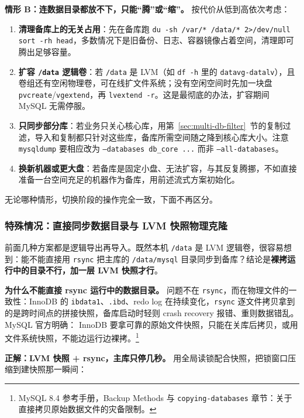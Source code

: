 \documentclass[12pt,UTF8]{ctexbook}
\begin{document}
\textbf{情形 B：连数据目录都放不下，只能“腾”或“缩”。} 按代价从低到高依次考虑：

\begin{enumerate}[leftmargin=2cm]
  \item \textbf{清理备库上的无关占用}：先在备库跑 \texttt{du -sh /var/* /data/* 2>/dev/null \textbar{} sort -rh \textbar{} head}，多数情况下是旧备份、日志、容器镜像占着空间，清理即可腾出足够容量。
  \item \textbf{扩容 \texttt{/data} 逻辑卷}：若 \texttt{/data} 是 LVM（如 \texttt{df -h} 里的 \texttt{datavg-datalv}），且卷组还有空闲物理卷，可在线扩文件系统；没有空闲空间时先加一块盘 \texttt{pvcreate}/\texttt{vgextend}，再 \texttt{lvextend -r}。这是最彻底的办法，扩容期间 MySQL 无需停服。
  \item \textbf{只同步部分库}：若业务只关心核心库，用第~\ref{sec:multi-db-filter}~节的复制过滤，导入和复制都只针对这些库，备库所需空间随之降到核心库大小。注意 \texttt{mysqldump} 要相应改为 \texttt{--databases db\_core ...} 而非 \texttt{--all-databases}。
  \item \textbf{换新机器或更大盘}：若备库是固定小盘、无法扩容，与其反复腾挪，不如直接准备一台空间充足的机器作为备库，用前述流式方案初始化。
\end{enumerate}

无论哪种情形，切换阶段的操作完全一致，下面不再区分。

\subsubsection{特殊情况：直接同步数据目录与 LVM 快照物理克隆}

前面几种方案都是逻辑导出再导入。既然本机 \texttt{/data} 是 LVM 逻辑卷，很容易想到：能不能直接用 \texttt{rsync} 把主库的 \texttt{/data/mysql} 目录同步到备库？结论是\textbf{裸拷运行中的目录不行，加一层 LVM 快照才行}。

\textbf{为什么不能直接 rsync 运行中的数据目录。} 问题不在 \texttt{rsync}，而在物理文件的一致性：InnoDB 的 \texttt{ibdata1}、\texttt{.ibd}、redo log 在持续变化，\texttt{rsync} 逐文件拷贝拿到的是跨时间点的拼接快照，备库启动时轻则 crash recovery 报错、重则数据错乱。MySQL 官方明确： InnoDB 要拿可靠的原始文件快照，只能在关库后拷贝，或用文件系统快照，不能边运行边裸拷。\footnote{MySQL 8.4 参考手册，Backup Methods 与 \texttt{copying-databases} 章节：关于直接拷贝原始数据文件的灾备限制。}

\textbf{正解：LVM 快照 + rsync，主库只停几秒。} 用全局读锁配合快照，把锁窗口压缩到建快照那一瞬间：
\end{document}

